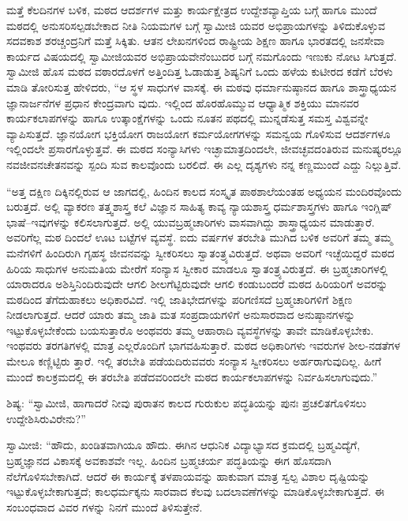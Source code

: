 ಮತ್ತೆ ಕೆಲದಿನಗಳ ಬಳಿಕ, ಮಠದ ಆದರ್ಶಗಳ ಮತ್ತು ಕಾರ್ಯಕ್ಷೇತ್ರದ ಉದ್ದೇಶವ್ಯಾಪ್ತಿಯ ಬಗ್ಗೆ ಹಾಗೂ ಮುಂದೆ ಮಠದಲ್ಲಿ ಅನುಸರಿಸಲ್ಪಡಬೇಕಾದ ನೀತಿ ನಿಯಮಗಳ ಬಗ್ಗೆ ಸ್ವಾಮೀಜಿ ಯವರ ಅಭಿಪ್ರಾಯಗಳನ್ನು ತಿಳಿದುಕೊಳ್ಳುವ ಸದವಕಾಶ ಶರಚ್ಚಂದ್ರನಿಗೆ ಮತ್ತೆ ಸಿಕ್ಕಿತು. ಆತನ ಲೇಖನಗಳಿಂದ ರಾಷ್ಟ್ರೀಯ ಶಿಕ್ಷಣ ಹಾಗೂ ಭಾರತದಲ್ಲಿ ಜನಸೇವಾ ಕಾರ್ಯದ ವಿಷಯದಲ್ಲಿ ಸ್ವಾಮೀಜಿಯವರ ಅಭಿಪ್ರಾಯವೇನೆಂಬುದರ ಬಗ್ಗೆ ನಮಗೊಂದು ಇಣುಕು ನೋಟ ಸಿಗುತ್ತದೆ. ಸ್ವಾಮೀಜಿ ಹೊಸ ಮಠದ ವಠಾರದೊಳಗೆ ಅತ್ತಿಂದಿತ್ತ ಓಡಾಡುತ್ತ ಶಿಷ್ಯನಿಗೆ ಒಂದು ಹಳೆಯ ಕುಟೀರದ ಕಡೆಗೆ ಬೆರಳು ಮಾಡಿ ತೋರಿಸುತ್ತ ಹೇಳಿದರು, “ಆ ಸ್ಥಳ ಸಾಧುಗಳ ವಾಸಕ್ಕೆ. ಈ ಮಠವು ಧರ್ಮಾನುಷ್ಠಾನದ ಹಾಗೂ ಶಾಸ್ತ್ರಾಧ್ಯಯನ ಜ್ಞಾನಾರ್ಜನೆಗಳ ಪ್ರಧಾನ ಕೇಂದ್ರವಾಗು ವುದು. ಇಲ್ಲಿಂದ ಹೊರಹೊಮ್ಮುವ ಆಧ್ಯಾತ್ಮಿಕ ಶಕ್ತಿಯು ಮಾನವರ ಕಾರ್ಯಕಲಾಪಗಳನ್ನು ಹಾಗೂ ಉತ್ಕಾಂಕ್ಷೆಗಳನ್ನು ಒಂದು ನೂತನ ಪಥದಲ್ಲಿ ಮುನ್ನಡೆಸುತ್ತ ಸಮಸ್ತ ವಿಶ್ವವನ್ನೇ ವ್ಯಾಪಿಸುತ್ತದೆ. ಜ್ಞಾನಯೋಗ ಭಕ್ತಿಯೋಗ ರಾಜಯೋಗ ಕರ್ಮಯೋಗಗಳನ್ನು ಸಮನ್ವಯ ಗೊಳಿಸುವ ಆದರ್ಶಗಳೂ ಇಲ್ಲಿಂದಲೇ ಪ್ರಸಾರಗೊಳ್ಳುತ್ತವೆ. ಈ ಮಠದ ಸಂನ್ಯಾಸಿಗಳು ಇಚ್ಛಾಮಾತ್ರದಿಂದಲೇ, ಜೀವಚ್ಛವದಂತಿರುವ ಮನುಷ್ಯರಲ್ಲೂ ನವಜೀವನಚೇತನವನ್ನು ಸ್ಪಂದಿ ಸುವ ಕಾಲವೊಂದು ಬರಲಿದೆ. ಈ ಎಲ್ಲ ದೃಶ್ಯಗಳು ನನ್ನ ಕಣ್ಣಮುಂದೆ ಎದ್ದು ನಿಲ್ಲುತ್ತಿವೆ.

“ಅತ್ತ ದಕ್ಷಿಣ ದಿಕ್ಕಿನಲ್ಲಿರುವ ಆ ಜಾಗದಲ್ಲಿ, ಹಿಂದಿನ ಕಾಲದ ಸಂಸ್ಕೃತ ಪಾಠಶಾಲೆಯಂತಹ ಅಧ್ಯಯನ ಮಂದಿರವೊಂದು ಬರುತ್ತದೆ. ಅಲ್ಲಿ ವ್ಯಾಕರಣ ತತ್ತ್ವಶಾಸ್ತ್ರ ಕಲೆ ವಿಜ್ಞಾನ ಸಾಹಿತ್ಯ ಕಾವ್ಯ ನ್ಯಾಯಶಾಸ್ತ್ರ ಧರ್ಮಶಾಸ್ತ್ರಗಳು ಹಾಗೂ ಇಂಗ್ಲಿಷ್ ಭಾಷೆ–ಇವುಗಳನ್ನು ಕಲಿಸಲಾಗುತ್ತದೆ. ಅಲ್ಲಿ ಯುವಬ್ರಹ್ಮಚಾರಿಗಳು ವಾಸವಾಗಿದ್ದು ಶಾಸ್ತ್ರಾಧ್ಯಯನ ಮಾಡುತ್ತಾರೆ. ಅವರಿಗೆಲ್ಲ ಮಠ ದಿಂದಲೆ ಊಟ ಬಟ್ಟೆಗಳ ವ್ಯವಸ್ಥೆ. ಐದು ವರ್ಷಗಳ ತರಬೇತಿ ಮುಗಿದ ಬಳಿಕ ಅವರಿಗೆ ತಮ್ಮ ತಮ್ಮ ಮನೆಗಳಿಗೆ ಹಿಂದಿರುಗಿ ಗೃಹಸ್ಥ ಜೀವನವನ್ನು ಸ್ವೀಕರಿಸಲು ಸ್ವಾತಂತ್ರ್ಯವಿರುತ್ತದೆ. ಅಥವಾ ಅವರಿಗೆ ಇಚ್ಛೆಯಿದ್ದರೆ ಮಠದ ಹಿರಿಯ ಸಾಧುಗಳ ಅನುಮತಿಯ ಮೇರೆಗೆ ಸಂನ್ಯಾಸ ಸ್ವೀಕಾರ ಮಾಡಲೂ ಸ್ವಾತಂತ್ರ್ಯವಿರುತ್ತದೆ. ಈ ಬ್ರಹ್ಮಚಾರಿಗಳಲ್ಲಿ ಯಾರಾದರೂ ಅಶಿಸ್ತಿನಿಂದಿರುವುದೇ ಆಗಲಿ ಶೀಲಗೆಟ್ಟಿರುವುದೇ ಆಗಲಿ ಕಂಡುಬಂದರೆ ಮಠದ ಹಿರಿಯರಿಗೆ ಅವರನ್ನು ಮಠದಿಂದ ತೆಗೆದುಹಾಕಲು ಅಧಿಕಾರವಿದೆ. ಇಲ್ಲಿ ಜಾತಿಭೇದಗಳನ್ನು ಪರಿಗಣಿಸದೆ ಬ್ರಹ್ಮಚಾರಿಗಳಿಗೆ ಶಿಕ್ಷಣ ನೀಡಲಾಗುತ್ತದೆ. ಆದರೆ ಯಾರು ತಮ್ಮ ಜಾತಿ ಮತ ಸಂಪ್ರದಾಯಗಳಿಗೆ ಅನುಸಾರವಾದ ಅನುಷ್ಠಾನಗಳನ್ನು ಇಟ್ಟುಕೊಳ್ಳಬೇಕೆಂದು ಬಯಸುತ್ತಾರೊ ಅಂಥವರು ತಮ್ಮ ಆಹಾರಾದಿ ವ್ಯವಸ್ಥೆಗಳನ್ನು ತಾವೇ ಮಾಡಿಕೊಳ್ಳಬೇಕು. ಇಂಥವರು ತರಗತಿಗಳಲ್ಲಿ ಮಾತ್ರ ಎಲ್ಲರೊಂದಿಗೆ ಭಾಗವಹಿಸುತ್ತಾರೆ. ಮಠದ ಅಧಿಕಾರಿಗಳು ಇವರುಗಳ ಶೀಲ-ನಡತೆಗಳ ಮೇಲೂ ಕಣ್ಣಿಟ್ಟಿರು ತ್ತಾರೆ. ಇಲ್ಲಿ ತರಬೇತಿ ಪಡೆಯದಿರುವವರು ಸಂನ್ಯಾಸ ಸ್ವೀಕರಿಸಲು ಅರ್ಹರಾಗುವುದಿಲ್ಲ. ಹೀಗೆ ಮುಂದೆ ಕಾಲಕ್ರಮದಲ್ಲಿ ಈ ತರಬೇತಿ ಪಡೆದವರಿಂದಲೇ ಮಠದ ಕಾರ್ಯಕಲಾಪಗಳನ್ನು ನಿರ್ವಹಿಸಲಾಗುವುದು.”

ಶಿಷ್ಯ: “ಸ್ವಾಮೀಜಿ, ಹಾಗಾದರೆ ನೀವು ಪುರಾತನ ಕಾಲದ ಗುರುಕುಲ ಪದ್ಧತಿಯನ್ನು ಪುನಃ ಪ್ರಚಲಿತಗೊಳಿಸಲು ಉದ್ದೇಶಿಸಿರುವಿರೇನು?”

ಸ್ವಾಮೀಜಿ: “ಹೌದು, ಖಂಡಿತವಾಗಿಯೂ ಹೌದು. ಈಗಿನ ಆಧುನಿಕ ವಿದ್ಯಾಭ್ಯಾಸದ ಕ್ರಮದಲ್ಲಿ ಬ್ರಹ್ಮವಿದ್ಯೆಗೆ, ಬ್ರಹ್ಮಜ್ಞಾನದ ವಿಕಾಸಕ್ಕೆ ಅವಕಾಶವೇ ಇಲ್ಲ. ಹಿಂದಿನ ಬ್ರಹ್ಮಚರ್ಯ ಪದ್ಧತಿಯನ್ನು ಈಗ ಹೊಸದಾಗಿ ನೆಲೆಗೊಳಿಸಬೇಕಾಗಿದೆ. ಆದರೆ ಈ ಕಾರ್ಯಕ್ಕೆ ತಳಪಾಯವನ್ನು ಹಾಕುವಾಗ ಮಾತ್ರ ಸ್ವಲ್ಪ ವಿಶಾಲ ದೃಷ್ಟಿಯನ್ನು ಇಟ್ಟುಕೊಳ್ಳಬೇಕಾಗುತ್ತದೆ; ಕಾಲಧರ್ಮಕ್ಕನು ಸಾರವಾದ ಕೆಲವು ಬದಲಾವಣೆಗಳನ್ನು ಮಾಡಿಕೊಳ್ಳಬೇಕಾಗುತ್ತದೆ. ಈ ಸಂಬಂಧವಾದ ವಿವರ ಗಳನ್ನು ನಿನಗೆ ಮುಂದೆ ತಿಳಿಸುತ್ತೇನೆ.

